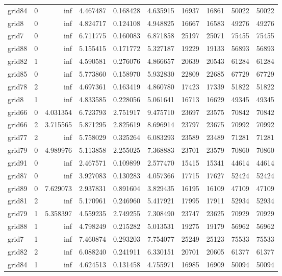 \begin{longtable}{|l|r|r|r|r|r|r|r|r|r|}
grid84 & 0 & inf & 4.467487 & 0.168428 & 4.635915 & 16937 & 16861 & 50022 & 50022 \\
grid8 & 0 & inf & 4.824717 & 0.124108 & 4.948825 & 16667 & 16583 & 49276 & 49276 \\
grid7 & 0 & inf & 6.711775 & 0.160083 & 6.871858 & 25197 & 25071 & 75455 & 75455 \\
grid88 & 0 & inf & 5.155415 & 0.171772 & 5.327187 & 19229 & 19133 & 56893 & 56893 \\
grid82 & 1 & inf & 4.590581 & 0.276076 & 4.866657 & 20639 & 20543 & 61284 & 61284 \\
grid85 & 0 & inf & 5.773860 & 0.158970 & 5.932830 & 22809 & 22685 & 67729 & 67729 \\
grid78 & 2 & inf & 4.697361 & 0.163419 & 4.860780 & 17423 & 17339 & 51822 & 51822 \\
grid8 & 1 & inf & 4.833585 & 0.228056 & 5.061641 & 16713 & 16629 & 49345 & 49345 \\
grid66 & 0 & 4.031354 & 6.723793 & 2.751917 & 9.475710 & 23697 & 23575 & 70842 & 70842 \\
grid66 & 2 & 3.715565 & 5.871295 & 2.825619 & 8.696914 & 23797 & 23675 & 70992 & 70992 \\
grid77 & 2 & inf & 5.758029 & 0.325264 & 6.083293 & 23589 & 23489 & 71281 & 71281 \\
grid79 & 0 & 4.989976 & 5.113858 & 2.255025 & 7.368883 & 23701 & 23579 & 70860 & 70860 \\
grid91 & 0 & inf & 2.467571 & 0.109899 & 2.577470 & 15415 & 15341 & 44614 & 44614 \\
grid87 & 0 & inf & 3.927083 & 0.130283 & 4.057366 & 17715 & 17627 & 52424 & 52424 \\
grid89 & 0 & 7.629073 & 2.937831 & 0.891604 & 3.829435 & 16195 & 16109 & 47109 & 47109 \\
grid81 & 2 & inf & 5.170961 & 0.246960 & 5.417921 & 17995 & 17911 & 52934 & 52934 \\
grid79 & 1 & 5.358397 & 4.559235 & 2.749255 & 7.308490 & 23747 & 23625 & 70929 & 70929 \\
grid88 & 1 & inf & 4.798249 & 0.215282 & 5.013531 & 19275 & 19179 & 56962 & 56962 \\
grid7 & 1 & inf & 7.460874 & 0.293203 & 7.754077 & 25249 & 25123 & 75533 & 75533 \\
grid82 & 2 & inf & 6.088240 & 0.241911 & 6.330151 & 20701 & 20605 & 61377 & 61377 \\
grid84 & 1 & inf & 4.624513 & 0.131458 & 4.755971 & 16985 & 16909 & 50094 & 50094 \\

\end{longtable}
